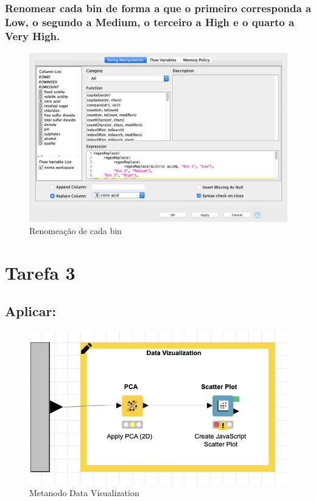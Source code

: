 \documentclass{article}
\begin{document}
\subsubsection{Renomear cada bin de forma a que o primeiro corresponda a Low, o segundo a Medium, o terceiro a High e o quarto a Very High.}

\begin{figure}[H]
    \centering
    \includegraphics[scale=0.3]{Images/T2_d.png}
    \caption{Renomeação de cada bin}
\end{figure}

\clearpage

\section{Tarefa 3}

\subsection{Aplicar:}

\begin{figure}[H]
    \centering
    \includegraphics[scale=0.5]{Images/T3.png}
    \caption{Metanodo Data Visualization}
\end{figure}
\end{document}
